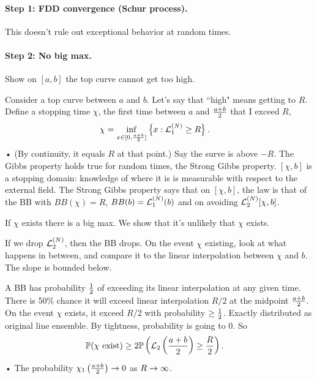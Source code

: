 \paragraph{Step 1: FDD convergence (Schur process). }

This doesn't rule out exceptional behavior at random times.


\paragraph{Step 2: No big max.} Show on $[a,b]$ the top curve cannot get too high.

Consider a top curve between $a$ and $b$. Let's say that ``high" means getting to $R$. 
Define a stopping time $\chi$, the first time between $a$ and $\frac{a+b}{2}$ that I exceed $R$, 
\begin{align*}
\chi &= \inf_{x\in [0,\frac{a+b}{2}]}\left\{{x}:{\mathcal{L}_1^{(N)}\ge R}\right\}.
\end{align*}•
(By continuity, it equals $R$ at that point.) Say the surve is above $-R$.
The Gibbs property holds true for random times, the Strong Gibbs property. 
$[\chi, b]$ is a stopping domain: knowledge of where it is is measurable with respect to the external field. 
The Strong Gibbs property says that on $[\chi,b]$, the law is that of the BB with $BB(\chi)=R$, $BB(b)=\mathcal{L}_1^{(N)}(b)$ and on avoiding $\mathcal{L}_2^{(N)}[\chi,b]$. 

If $\chi$ exists there is a big max. We show that it's unlikely that $\chi$ exists.

If we drop $\mathcal{L}_2^{(N)}$, then the BB drops.
On the event $\chi$ existing, look at what happens in between, and compare it to the linear interpolation between $\chi$ and $b$. The slope is bounded below. 

A BB has probability $\frac{1}{2}$ of exceeding its linear %
interpolation at any given time. There is 50\% chance it will exceed linear interpolation $R/2$  at the midpoint $\frac{a+b}{2}$. On the event $\chi$ exists, it exceed $R/2$ with probability $\ge \frac{1}{2}$. Exactly distributed as original line ensemble. By tightness, probability is going to 0. So 
\begin{align*}
\mathbb{P}(\chi\text{ exist}) &\ge 2\mathbb{P}\left( {\mathcal{L}_2\left( {\frac{a+b}{2}} \right)\ge \frac{R}{2}} \right).
\end{align*}•
The probability $\chi_1\left( {\frac{a+b}{2}} \right)\to 0$ as $R\to \infty$.

